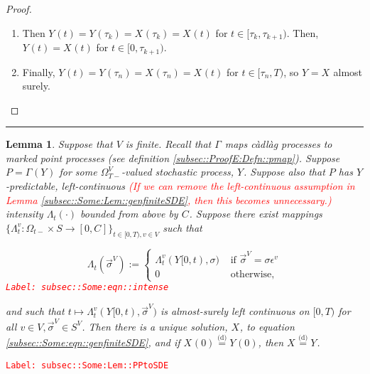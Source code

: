 \documentclass[12pt]{article}
\newcommand{\ra}{\rightarrow}
\newcommand{\te}{\text}
\newcommand{\ep}{\epsilon}
\newcommand{\tr}{\textcolor{red}}
\newcommand{\labe}[1]{\tr{\texttt{Label: #1}}}
\newcommand{\lin}{\rule{\linewidth}{0.4 pt}}
\newcommand{\deq}{\overset{\text{(d)}}{=}}			%
\renewcommand{\v}{v}							%
\renewcommand{\S}{S}							%
\newcommand{\s}{\sigma}							%
\newcommand{\sv}{\vec{\s}}						%
\newcommand{\ev}{\ep}							%
\newcommand{\T}{T}								%
\renewcommand{\t}{t}							%
\newcommand{\sset}{\Omega}						%
\newcommand{\X}{X}								%
\newcommand{\vind}[1]{^{#1}}					%
\newcommand{\carp}[1]{^{#1}}					%
\newcommand{\vsi}[1]{^{#1}}						%
\newcommand{\cind}[1]{_{#1}}					%
\newcommand{\tp}[1]{(#1)}						%
\newcommand{\tip}[1]{#1}						%
\newcommand{\ts}[1]{_{#1}}						%
\newcommand{\const}{C}							%
\newcommand{\indx}[1]{_{#1}}					%
\newcommand{\XX}{Y}								%
\newcommand{\rt}{\tau}							%
\renewcommand{\it}{k}							%
\newcommand{\pmap}{\Gamma}						%
\newcommand{\rp}{P}								%
\newcommand{\ratee}{\Lambda}					%
\newtheorem{lem}[thms]{Lemma}
\begin{document}
\begin{proof}
\begin{enumerate}
\item Then \(\XX\cind{}\tp{\t} = \XX\cind{}\tp{\rt\indx{\it}} = \X\cind{}\tp{\rt\indx{\it}} = \X\cind{}\tp{\t}\) for \(\t \in [\rt\indx{\it},\rt\indx{\it+1})\). Then, \(\XX\cind{}\tp{\t} = \X\cind{}\tp{\t}\) for \(\t\in [0,\rt\indx{\it+1})\).

\item Finally, \(\XX\cind{}\tp{\t} = \XX\cind{}\tp{\rt\indx{n}} = \X\cind{}\tp{\rt\indx{n}} = \X\cind{}\tp{\t}\) for \(\t\in [\rt\indx{n},\T)\), so \(\XX\cind{}\tip{} = \X\cind{}\tip{}\) almost surely.
\end{enumerate}
\end{proof}

\lin

\begin{lem}
Suppose that \(V\) is finite. Recall that \(\pmap\vind{}\) maps c\`adl\`ag processes to marked point processes (see definition \ref{subsec::ProofE:Defn::pmap}). Suppose \(\rp = \pmap\vind{}(\XX\cind{}\tip{})\) for some \(\sset\vsi{V}\ts{\T-}\)-valued stochastic process, \(\XX\cind{}\tip{}\). Suppose also that \(\rp\) has \(\XX\cind{}\tip{}\)-predictable, left-continuous \tr{(If we can remove the left-continuous assumption in Lemma \ref{subsec::Some:Lem::genfiniteSDE}, then this becomes unnecessary.)} intensity \(\ratee\ts{\t}(\cdot)\) bounded from above by \(\const\indx{}\). Suppose there exist mappings \(\{\ratee\ts{\t}\vind{\v}:\sset\vsi{}\ts{\t-}\times \S \ra [0,\const\indx{}]\}_{\t\in[0,\T),\v\in V}\) such that 

\begin{equation}
\ratee\ts{\t}(\sv\cind{}\vsi{V}) := \begin{cases}
\ratee\ts{\t}\vind{\v}(\XX\cind{}\tip{[0,\t)},\s) &\te{ if } \sv\cind{}\vsi{V} = \s\ev\vind{\v}\\
0 &\te{ otherwise,}
\end{cases}
\label{subsec::Some:eqn::intense}
\end{equation}
\labe{subsec::Some:eqn::intense}

and such that \(\t\mapsto \ratee\ts{\t}\vind{\v}(\XX\cind{}\tip{[0,\t)},\sv\cind{}\vsi{V})\) is almost-surely left continuous on \([0,\T)\) for all \(\v\in V,\sv\cind{}\vsi{V}\in \S\carp{V}\). Then there is a unique solution, \(\X\cind{}\tip{}\), to equation \eqref{subsec::Some:eqn::genfiniteSDE}, and if \(\X\cind{}\tp{0} \deq \XX\cind{}\tp{0}\), then \(\X\cind{}\tip{} \deq \XX\cind{}\tip{}\).

\label{subsec::Some:Lem::PPtoSDE}
\end{lem}
\labe{subsec::Some:Lem::PPtoSDE}
\end{document}
